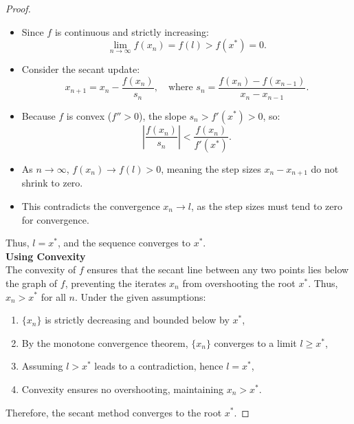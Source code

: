 \documentclass{article}
\begin{document}
\begin{proof}
    \begin{itemize}
        \item Since \( f \) is continuous and strictly increasing:
        \[
        \lim_{n \to \infty} f(x_n) = f(l) > f(x^\ast) = 0.
        \]
        \item Consider the secant update:
        \[
        x_{n+1} = x_n - \frac{f(x_n)}{s_n}, \quad \text{where } s_n = \frac{f(x_n) - f(x_{n-1})}{x_n - x_{n-1}}.
        \]
        \item Because \( f \) is convex (\( f'' > 0 \)), the slope \( s_n > f'(x^\ast) > 0 \), so:
        \[
        \left| \frac{f(x_n)}{s_n} \right| < \frac{f(x_n)}{f'(x^\ast)}.
        \]
        \item As \( n \to \infty \), \( f(x_n) \to f(l) > 0 \), meaning the step sizes \( x_n - x_{n+1} \) do not shrink to zero.
        \item This contradicts the convergence \( x_n \to l \), as the step sizes must tend to zero for convergence.
    \end{itemize}
    Thus, \( l = x^\ast \), and the sequence converges to \( x^\ast \).
    \\
    \textbf{Using Convexity}
    \\
    The convexity of \( f \) ensures that the secant line between any two points lies below the graph of \( f \), preventing the iterates \( x_n \) from overshooting the root \( x^\ast \). Thus, \( x_n > x^\ast \) for all \( n \).
    Under the given assumptions:
    \begin{enumerate}
        \item \( \{x_n\} \) is strictly decreasing and bounded below by \( x^\ast \),
        \item By the monotone convergence theorem, \( \{x_n\} \) converges to a limit \( l \geq x^\ast \),
        \item Assuming \( l > x^\ast \) leads to a contradiction, hence \( l = x^\ast \),
        \item Convexity ensures no overshooting, maintaining \( x_n > x^\ast \).
    \end{enumerate}
    
    Therefore, the secant method converges to the root \( x^\ast \).
\end{proof}

\newpage
\end{document}
